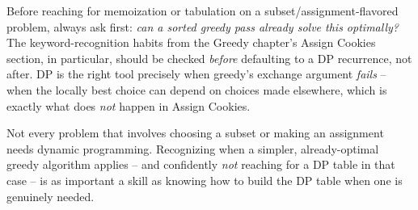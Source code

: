 \begin{ideabox}
Before reaching for memoization or tabulation on a subset/assignment-flavored
problem, always ask first: \emph{can a sorted greedy pass already solve
this optimally?} The keyword-recognition habits from the Greedy chapter's
Assign Cookies section, in particular, should be
checked \emph{before} defaulting to a DP recurrence, not after. DP is
the right tool precisely when greedy's exchange argument \emph{fails} --
when the locally best choice can depend on choices made elsewhere, which
is exactly what does \emph{not} happen in Assign Cookies.
\end{ideabox}

\begin{takeawaybox}
Not every problem that involves choosing a subset or making an
assignment needs dynamic programming. Recognizing when a simpler,
already-optimal greedy algorithm applies -- and confidently \emph{not}
reaching for a DP table in that case -- is as important a skill as
knowing how to build the DP table when one is genuinely needed.
\end{takeawaybox}
